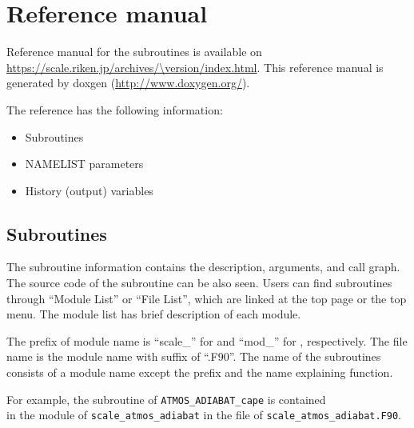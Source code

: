 \section{Reference manual} \label{sec:reference_manual}
Reference manual for the \scalelib subroutines is available on\\
\url{https://scale.riken.jp/archives/\version/index.html}.
This reference manual is generated by doxgen (\url{http://www.doxygen.org/}).

The reference has the following information:
\begin{itemize}
\item Subroutines
\item NAMELIST parameters
\item History (output) variables
\end{itemize}


\subsection{Subroutines}
The subroutine information contains the description, arguments, and call graph.
The source code of the subroutine can be also seen.
Users can find subroutines through ``Module List'' or ``File List'', which are linked at the top page or the top menu.
The module list has brief description of each module.

The prefix of module name is ``scale\_'' for \scalelib and ``mod\_'' for \scalerm, respectively.
The file name is the module name with suffix of ``.F90''.
The name of the subroutines consists of a module name except the prefix and the name explaining function.

For example, the subroutine of \verb|ATMOS_ADIABAT_cape| is contained \\
in the module of \verb|scale_atmos_adiabat| in the file of \verb|scale_atmos_adiabat.F90|.



